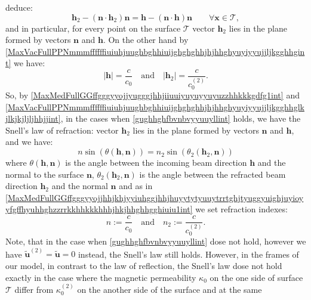 \documentclass{article}
\theoremstyle{definition}
\theoremstyle{remark}
\renewcommand{\vec}[1]{\mathbf{#1}}
\newcommand{\er}{\eqref}
\newcommand{\er}{\eqref}
\begin{document}
deduce:
\begin{equation}\label{MaxMedFullGGffgggyyojjyugggjhhjiiuuiyuyuyyuyuzzhhkkkgdfg1int}
\vec h_2-\left(\vec n\cdot \vec h_2\right)\vec n=\vec h-\left(\vec
n\cdot \vec h\right)\vec n\quad\quad\forall\vec x\in\mathcal{T},
\end{equation}
and in particular, for every point on the surface $\mathcal{T}$
vector $\vec h_2$ lies in the plane formed by vectors $\vec n$ and
$\vec h$. On the other hand by
\er{MaxVacFullPPNmmmffffffiuiuhjuughbghhiuijghghghhjhjhhghyuyiyyujjljkgghhgint}
we have:
\begin{equation}\label{MaxVacFullPPNmmmffffffiuiuhjuughbghhiuijghghghhjhjhhghyuyiyyujjljkgghhglkjlkjkjljljhhjjint}
|\vec h|=\frac{c}{c_0}\quad\text{and}\quad|\vec
h_2|=\frac{c}{c^{(2)}_0}.
\end{equation}
So, by
\er{MaxMedFullGGffgggyyojjyugggjhhjiiuuiyuyuyyuyuzzhhkkkgdfg1int}
and
\er{MaxVacFullPPNmmmffffffiuiuhjuughbghhiuijghghghhjhjhhghyuyiyyujjljkgghhglkjlkjkjljljhhjjint},
in the cases when \er{gughhghfbvnbvyyuuyllint} holds, we have the
Snell's law of refraction: vector $\vec h_2$ lies in the plane
formed by vectors $\vec n$ and $\vec h$, and we have:
\begin{equation}\label{MaxMedFulljhhjjjjjhhhjint}
n\sin{\left(\theta\left(\vec h,\vec
n\right)\right)}=n_2\sin{\left(\theta_2\left(\vec h_2,\vec
n\right)\right)}
\end{equation}
where $\theta\left(\vec h,\vec n\right)$ is the angle between the
incoming beam direction $\vec h$ and the normal to the surface $\vec
n$, $\theta_2\left(\vec h_2,\vec n\right)$ is the angle between the
refracted beam direction $\vec h_2$ and the normal $\vec n$ and as
in
\er{MaxMedFullGGffgggyyojjhhjkhjyyiuhggjhhjhuyytytyuuytrrtghjtyuggyuighjuyioyyfgffhyuhhghzzrrkkhhkkkhhhjhkjhhghhgghiuiu1int}
we set refraction indexes:
\begin{equation}\label{MaxMedFullGGffgggyyojjhhjkhjyyiuhggjhhjhuyytytyuuytrrtghjtyuggyuighjuyioyyfgffhyuhhghzzrrkkhhkkkhhhjhkjhhghhgghiuiujjkjkint}
n:=\frac{c}{c_0}\quad\text{and}\quad n_2:=\frac{c}{c^{(2)}_0}.
\end{equation}
Note, that in the case when \er{gughhghfbvnbvyyuuyllint} dose not
hold, however we have $\vec {\tilde u}^{(2)}=\vec {\tilde u}=0$
instead, the Snell's law still holds. However, in the frames of our
model, in contrast to the law of reflection, the Snell's law dose
not hold exactly in the case where the magnetic permeability
$\kappa_0$ on the one side of surface $\mathcal{T}$ differ from
$\kappa^{(2)}_0$ on the another side of the surface and at the same
\end{document}
